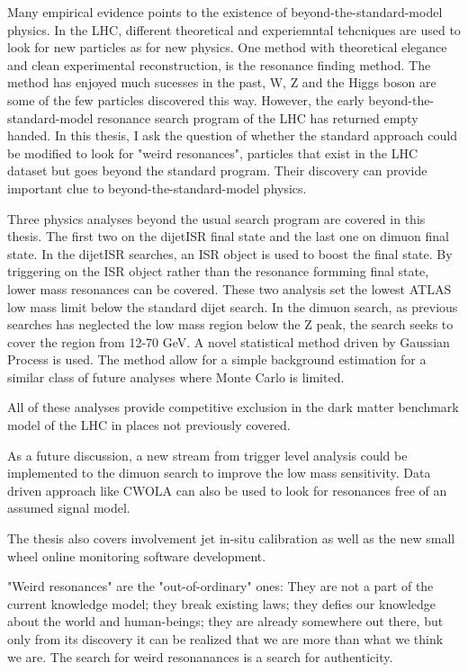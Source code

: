 Many empirical evidence points to the existence of beyond-the-standard-model physics. In the LHC, different theoretical and experiemntal tehcniques are used to look for new particles as for new physics. One method with theoretical elegance and clean experimental reconstruction, is the resonance finding method. The method has enjoyed much sucesses in the past, W, Z and the Higgs boson are some of the few particles discovered this way. However, the early beyond-the-standard-model resonance search program of the LHC has returned empty handed. 
In this thesis, I ask the question of whether the standard approach could be modified to look for "weird resonances", particles that exist in the LHC dataset but goes beyond the standard program. Their discovery can provide important clue to beyond-the-standard-model physics. 

Three physics analyses beyond the usual search program are covered in this thesis. The first two on the dijetISR final state and the last one on dimuon final state. In the dijetISR searches, an ISR object is used to boost the final state. By triggering on the ISR object rather than the resonance formming final state, lower mass resonances can be covered. These two analysis set the lowest ATLAS low mass limit below the standard dijet search. In the dimuon search, as previous searches has neglected the low mass region below the Z peak, the search seeks to cover the region from 12-70 GeV. A novel statistical method driven by Gaussian Process is used. The method allow for a simple background estimation for a similar class of future analyses where Monte Carlo is limited.

All of these analyses provide competitive exclusion in the dark matter benchmark model of the LHC in places not previously covered.

As a future discussion, a new stream from trigger level analysis could be implemented to the dimuon search to improve the low mass sensitivity. Data driven approach like CWOLA can also be used to look for resonances free of an assumed signal model.

The thesis also covers involvement jet in-situ calibration as well as the new small wheel online monitoring software development.

"Weird resonances" are the "out-of-ordinary" ones: They are not a part of the current knowledge model; they break existing laws; they defies our knowledge about the world and human-beings; they are already somewhere out there, but only from its discovery it can be realized that we are more than what we think we are. The search for weird resonanances is a search for authenticity.
